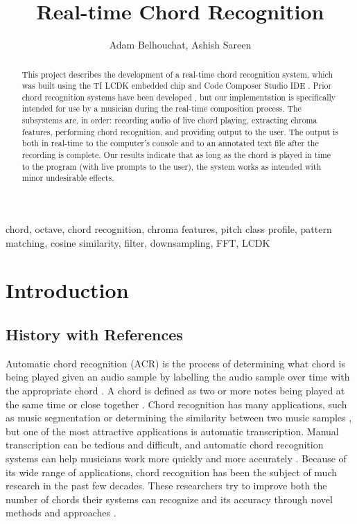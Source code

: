 \documentclass[journal]{IEEEtran}
\begin{document}
\title{Real-time Chord Recognition}
\author{Adam Belhouchat, Ashish Sareen}
\maketitle

\begin{abstract}
    This project describes the development of a real-time chord recognition system, which was built using the TI LCDK embedded chip and Code Composer Studio IDE \cite{lcdk, ccs}.
    Prior chord recognition systems have been developed \cite{stark, cho, harte, lee, mauch_thesis, mauch_simultaneous, jiang, pauwels, fujishima}, but our implementation is specifically intended for use by a musician during the real-time composition process.
    The subsystems are, in order: recording audio of live chord playing, extracting chroma features, performing chord recognition, and providing output to the user.
    The output is both in real-time to the computer’s console and to an annotated text file after the recording is complete.
    Our results indicate that as long as the chord is played in time to the program (with live prompts to the user), the system works as intended with minor undesirable effects.
\end{abstract}
\begin{IEEEkeywords}
    chord, octave, chord recognition, chroma features, pitch class profile, pattern matching, cosine similarity, filter, downsampling, FFT, LCDK
\end{IEEEkeywords}

\section{Introduction}
\subsection{History with References}
Automatic chord recognition (ACR) is the process of determining what chord is being played given an audio sample by labelling the audio sample over time with the appropriate chord \cite{stark}.
A chord is defined as two or more notes being played at the same time or close together \cite{cho}.
Chord recognition has many applications, such as music segmentation or determining the similarity between two music samples \cite{lee}, but one of the most attractive applications is automatic transcription.
Manual transcription can be tedious and difficult, and automatic chord recognition systems can help musicians work more quickly and more accurately \cite{mauch_thesis}.
Because of its wide range of applications, chord recognition has been the subject of much research in the past few decades.
These researchers try to improve both the number of chords their systems can recognize and its accuracy through novel methods and approaches \cite{pauwels}.
\end{document}
